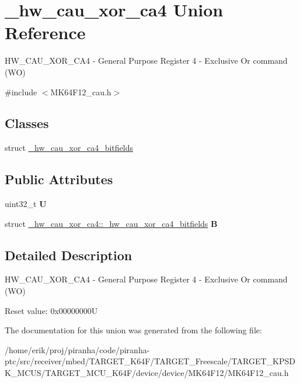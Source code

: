 \hypertarget{union__hw__cau__xor__ca4}{}\section{\+\_\+hw\+\_\+cau\+\_\+xor\+\_\+ca4 Union Reference}
\label{union__hw__cau__xor__ca4}


H\+W\+\_\+\+C\+A\+U\+\_\+\+X\+O\+R\+\_\+\+C\+A4 -\/ General Purpose Register 4 -\/ Exclusive Or command (WO)  




{\ttfamily \#include $<$M\+K64\+F12\+\_\+cau.\+h$>$}

\subsection*{Classes}
\begin{DoxyCompactItemize}
\item 
struct \hyperlink{struct__hw__cau__xor__ca4_1_1__hw__cau__xor__ca4__bitfields}{\+\_\+hw\+\_\+cau\+\_\+xor\+\_\+ca4\+\_\+bitfields}
\end{DoxyCompactItemize}
\subsection*{Public Attributes}
\begin{DoxyCompactItemize}
\item 
uint32\+\_\+t {\bfseries U}\hypertarget{union__hw__cau__xor__ca4_a557e772941e9227eac06d7961cce2f4e}{}\label{union__hw__cau__xor__ca4_a557e772941e9227eac06d7961cce2f4e}

\item 
struct \hyperlink{struct__hw__cau__xor__ca4_1_1__hw__cau__xor__ca4__bitfields}{\+\_\+hw\+\_\+cau\+\_\+xor\+\_\+ca4\+::\+\_\+hw\+\_\+cau\+\_\+xor\+\_\+ca4\+\_\+bitfields} {\bfseries B}\hypertarget{union__hw__cau__xor__ca4_a0cbac619ff71ae228ee42915132169de}{}\label{union__hw__cau__xor__ca4_a0cbac619ff71ae228ee42915132169de}

\end{DoxyCompactItemize}


\subsection{Detailed Description}
H\+W\+\_\+\+C\+A\+U\+\_\+\+X\+O\+R\+\_\+\+C\+A4 -\/ General Purpose Register 4 -\/ Exclusive Or command (WO) 

Reset value\+: 0x00000000U 

The documentation for this union was generated from the following file\+:\begin{DoxyCompactItemize}
\item 
/home/erik/proj/piranha/code/piranha-\/ptc/src/receiver/mbed/\+T\+A\+R\+G\+E\+T\+\_\+\+K64\+F/\+T\+A\+R\+G\+E\+T\+\_\+\+Freescale/\+T\+A\+R\+G\+E\+T\+\_\+\+K\+P\+S\+D\+K\+\_\+\+M\+C\+U\+S/\+T\+A\+R\+G\+E\+T\+\_\+\+M\+C\+U\+\_\+\+K64\+F/device/device/\+M\+K64\+F12/M\+K64\+F12\+\_\+cau.\+h\end{DoxyCompactItemize}
